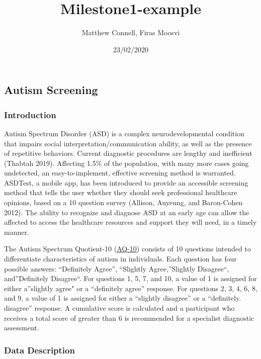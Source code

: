 \documentclass[]{article}
\title{Milestone1-example}
\author{Matthew Connell, Firas Moosvi}
\date{23/02/2020}
\begin{document}
\maketitle

\hypertarget{autism-screening}{%
\subsection{Autism Screening}\label{autism-screening}}

\hypertarget{introduction}{%
\subsubsection{Introduction}\label{introduction}}

Autism Spectrum Disorder (ASD) is a complex neurodevelopmental condition
that impairs social interpretation/communication ability, as well as the
presence of repetitive behaviors. Current diagnostic procedures are
lengthy and inefficient (Thabtah 2019). Affecting 1.5\% of the
population, with many more cases going undetected, an easy-to-implement,
effective screening method is warranted. ASDTest, a mobile app, has been
introduced to provide an accessible screening method that tells the user
whether they should seek professional healthcare opinions, based on a 10
question survey (Allison, Auyeung, and Baron-Cohen 2012). The ability to
recognize and diagnose ASD at an early age can allow the affected to
access the healthcare resources and support they will need, in a timely
manner.

The Autism Spectrum Quotient-10
(\href{https://www.nice.org.uk/guidance/cg142/resources/autism-spectrum-quotient-aq10-test-pdf-186582493}{AQ-10})
consists of 10 questions intended to differentiate characteristics of
autism in individuals. Each question has four possible answers:
``Definitely Agree'', ``Slightly Agree,''Slightly Disagree``,
and''Definitely Disagree``. For questions 1, 5, 7, and 10, a value of 1
is assigned for either a''slightly agree" or a ``definitely agree''
response. For questions 2, 3, 4, 6, 8, and 9, a value of 1 is assigned
for either a ``slightly disagree'' or a ``definitely. disagree''
response. A cumulative score is calculated and a participant who
receives a total score of greater than 6 is recommended for a specialist
diagnostic assessment.

\hypertarget{data-description}{%
\subsubsection{Data Description}\label{data-description}}
\end{document}
